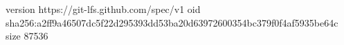version https://git-lfs.github.com/spec/v1
oid sha256:a2ff9a46507dc5f22d295393dd53ba20d63972600354bc379f0f4af5935be64c
size 87536
